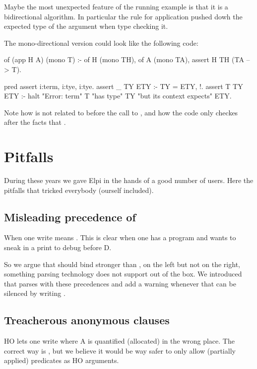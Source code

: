 \documentclass[a4paper, 11pt]{book}
\begin{document}
Maybe the most unexpected feature of the running example is that
it is a bidirectional algorithm. In particular the rule for application
pushed dowh the expected type of the argument when type checking it.

The mono-directional version could look like the following code:

\begin{elpicode}
of (app H A) (mono T) :-
  of H (mono TH),
  of A (mono TA),
  assert H TH (TA --> T).

pred assert i:term, i:tye, i:tye.
assert _ TY ETY :- TY = ETY, !.
assert T TY ETY :-
  halt "Error: term" T "has type" TY "but its context expects" ETY.
\end{elpicode}

Note how  is not related to  before the
call to  , and how the code only checkes
after the facts that .

\section{Pitfalls}

During these years we gave Elpi in the hands of a
good number of users. Here the pitfalls that tricked everybody (ourself included).

\subsection{Misleading precedence of \elpiinline{=>}}

When one write  means
. This is clear when
one has a program  and wants
to sneak in a print to debug before D.

So we argue that \elpiinline{=>} should bind stronger than ,
on the left but not on the right, something parsing
technology does not support out of the box. We introduced
\elpiinline{==>} that parses with these precedences and add a warning
whenever  that can be silenced
by writing .

\subsection{Treacherous anonymous clauses}

HO lets one write 
where A is quantified (allocated) in the wrong place.
The correct way is ,
but we believe it would be way safer to only allow (partially
applied) predicates as HO arguments.
\end{document}
